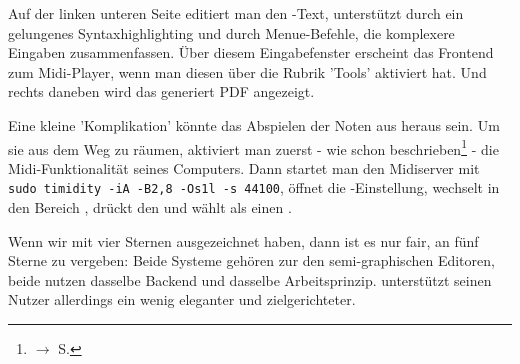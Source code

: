 Auf der linken unteren Seite editiert man den -Text, unterstützt durch ein gelungenes Syntaxhighlighting und durch Menue-Befehle, die komplexere Eingaben zusammenfassen. Über diesem Eingabefenster erscheint das Frontend zum Midi-Player, wenn man diesen über die Rubrik 'Tools' aktiviert hat. Und rechts daneben wird das generiert PDF angezeigt.

Eine kleine 'Komplikation' könnte das Abspielen der Noten aus  heraus sein. Um sie aus dem Weg zu räumen, aktiviert man zuerst - wie schon beschrieben\footnote{$\rightarrow$ S.\pageref{MIDI}} - die Midi-Funktionalität seines Computers. Dann startet man den Midiserver mit \texttt{sudo timidity -iA -B2,8 -Os1l -s 44100}, öffnet die -Einstellung, wechselt in den Bereich , drückt den  und wählt als  einen .


Wenn wir  mit vier Sternen ausgezeichnet haben, dann ist es nur
fair, an  fünf Sterne zu vergeben: Beide Systeme gehören zur den
semi-graphischen Editoren, beide nutzen dasselbe Backend und dasselbe
Arbeitsprinzip.  unterstützt seinen Nutzer allerdings ein wenig
eleganter und zielgerichteter.
%

